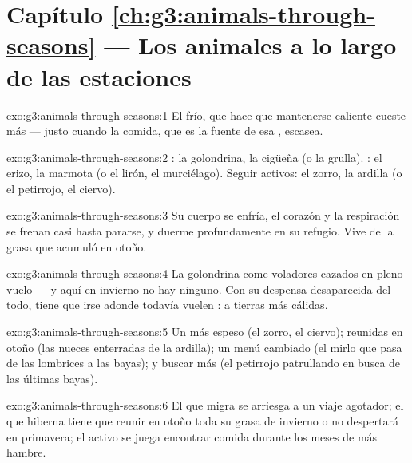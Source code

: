 \section*{Capítulo \ref{ch:g3:animals-through-seasons} --- Los animales a lo largo de las estaciones}

\begin{solution}{exo:g3:animals-through-seasons:1}
El frío, que hace que mantenerse caliente cueste más  ---
justo cuando la comida, que es la fuente de esa , escasea.
\end{solution}

\begin{solution}{exo:g3:animals-through-seasons:2}
: la golondrina, la cigüeña (o la grulla). : el erizo,
la marmota (o el lirón, el murciélago). Seguir activos: el zorro, la
ardilla (o el petirrojo, el ciervo).
\end{solution}

\begin{solution}{exo:g3:animals-through-seasons:3}
Su cuerpo se enfría, el corazón y la respiración se frenan casi hasta
pararse, y duerme profundamente en su refugio. Vive de la grasa que
acumuló en otoño.
\end{solution}

\begin{solution}{exo:g3:animals-through-seasons:4}
La golondrina come  voladores cazados en pleno vuelo --- y
aquí en invierno no hay ninguno. Con su despensa desaparecida del
todo, tiene que irse adonde todavía vuelen : a tierras más
cálidas.
\end{solution}

\begin{solution}{exo:g3:animals-through-seasons:5}
Un  más espeso (el zorro, el ciervo);  reunidas en otoño (las nueces enterradas de la ardilla); un
menú cambiado (el mirlo que pasa de las lombrices a las bayas); y
buscar más (el petirrojo patrullando en busca de las últimas bayas).
\end{solution}

\begin{solution}{exo:g3:animals-through-seasons:6}
El que migra se arriesga a un viaje agotador; el que hiberna tiene que
reunir en otoño toda su grasa de invierno o no despertará en
primavera; el  activo se juega encontrar comida durante los
meses de más hambre.
\end{solution}

